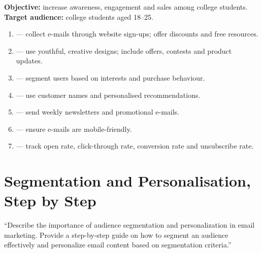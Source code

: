 \begin{exambox}
\textbf{Objective:} increase awareness, engagement and sales among college
students. \textbf{Target audience:} college students aged 18--25.

\begin{enumerate}
\item {} --- collect e-mails through website sign-ups;
      offer discounts and free resources.
\item {} --- use youthful, creative designs;
      include offers, contests and product updates.
\item {} --- segment users based on interests and purchase
      behaviour.
\item {} --- use customer names and personalised
      recommendations.
\item {} --- send weekly newsletters and promotional
      e-mails.
\item {} --- ensure e-mails are mobile-friendly.
\item {} --- track open rate, click-through rate,
      conversion rate and unsubscribe rate.
\end{enumerate}
\end{exambox}

\section{Segmentation and Personalisation, Step by Step}

\begin{keybox}
``Describe the importance of audience segmentation and personalization in email
marketing. Provide a step-by-step guide on how to segment an audience effectively
and personalize email content based on segmentation criteria.''
\end{keybox}

